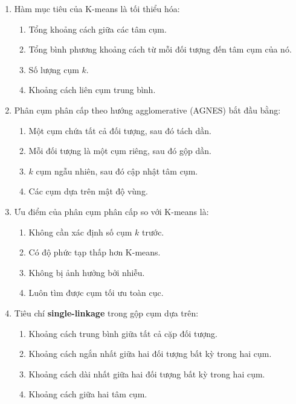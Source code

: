 \documentclass[10pt]{article}
\begin{document}
\begin{enumerate}[leftmargin=*, label=\textbf{Câu \arabic*.}]
    \item Hàm mục tiêu của K-means là tối thiểu hóa:
    \begin{enumerate}[label=\Alph*.]
        \item Tổng khoảng cách giữa các tâm cụm.
        \item Tổng bình phương khoảng cách từ mỗi đối tượng đến tâm cụm của nó.
        \item Số lượng cụm $k$.
        \item Khoảng cách liên cụm trung bình.
    \end{enumerate}

    \item Phân cụm phân cấp theo hướng agglomerative (AGNES) bắt đầu bằng:
    \begin{enumerate}[label=\Alph*.]
        \item Một cụm chứa tất cả đối tượng, sau đó tách dần.
        \item Mỗi đối tượng là một cụm riêng, sau đó gộp dần.
        \item $k$ cụm ngẫu nhiên, sau đó cập nhật tâm cụm.
        \item Các cụm dựa trên mật độ vùng.
    \end{enumerate}

    \item Ưu điểm của phân cụm phân cấp so với K-means là:
    \begin{enumerate}[label=\Alph*.]
        \item Không cần xác định số cụm $k$ trước.
        \item Có độ phức tạp thấp hơn K-means.
        \item Không bị ảnh hưởng bởi nhiễu.
        \item Luôn tìm được cụm tối ưu toàn cục.
    \end{enumerate}

    \item Tiêu chí \textbf{single-linkage} trong gộp cụm dựa trên:
    \begin{enumerate}[label=\Alph*.]
        \item Khoảng cách trung bình giữa tất cả cặp đối tượng.
        \item Khoảng cách ngắn nhất giữa hai đối tượng bất kỳ trong hai cụm.
        \item Khoảng cách dài nhất giữa hai đối tượng bất kỳ trong hai cụm.
        \item Khoảng cách giữa hai tâm cụm.
    \end{enumerate}


\end{enumerate}
\end{document}
